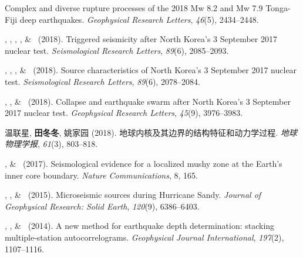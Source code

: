 \begin{etaremune}
    Complex and diverse rupture processes of the 2018 Mw 8.2 and Mw 7.9 Tonga-Fiji deep earthquakes.
    \emph{Geophysical Research Letters}, \emph{46}(5), 2434--2448.
\item
    \JYao\CF\CS, \Me\CF, \ZLu, \LSun, \& \LWen\ (2018).
    Triggered seismicity after North Korea's 3 September 2017 nuclear test.
    \emph{Seismological Research Letters}, \emph{89}(6), 2085--2093.
\item
    \JYao\CF\CS, \Me\CF, \LSun, \& \LWen\ (2018).
    Source characteristics of North Korea's 3 September 2017 nuclear test.
    \emph{Seismological Research Letters}, \emph{89}(6), 2078--2084.
\item
    \Me\CF\CS, \JYao\CF, \& \LWen\ (2018).
    Collapse and earthquake swarm after North Korea's 3 September 2017 nuclear test.
    \emph{Geophysical Research Letters}, \emph{45}(9), 3976--3983.
\item
    温联星\CS, \textbf{田冬冬}, 姚家园 (2018).
    地球内核及其边界的结构特征和动力学过程.
    \emph{地球物理学报}, \emph{61}(3), 803--818.
\item
    \Me, \& \LWen\CS\ (2017).
    Seismological evidence for a localized mushy zone at the Earth's inner core boundary.
    \emph{Nature Communications}, 8, 165.
\item
    \XChen\CS, \Me, \& \LWen\ (2015).
    Microseismic sources during Hurricane Sandy.
    \emph{Journal of Geophysical Research: Solid Earth}, \emph{120}(9), 6386--6403.
\item \MZhang\CS, \Me, \& \LWen\ (2014).
    A new method for earthquake depth determination: stacking multiple-station autocorrelograms.
    \emph{Geophysical Journal International}, \emph{197}(2), 1107--1116.
\end{etaremune}


